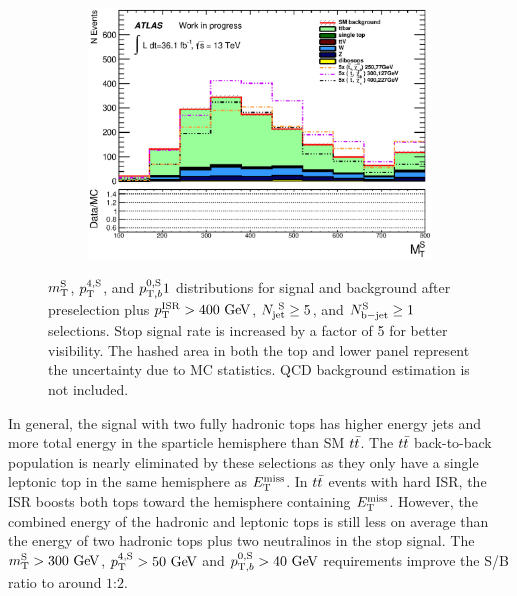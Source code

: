 \begin{figure}[h!]
\begin{center}
\begin{subfigure}[b]{0.40\textwidth}
    	 \includegraphics[width=\textwidth]{figures/plotSR/SR_ND1_MS_3SR.eps}
                \caption{ }
    \end{subfigure}
     \caption[~$\MS$, $\pTjV$, and $\pTbV$ distributions for signal and background after preselection plus $\PTISR > 400 \gev$, $\NjV \ge 5$, and $\nBJetS \ge 1$ selections]{ $\MS$, $\pTjV$, and $p_{\mathrm{T},b}^{0,\mathrm{S}}1$ distributions for signal and background after preselection plus $\PTISR > 400 \gev$, $\NjV \ge 5$, and $\nBJetS \ge 1$ selections.  Stop signal rate is increased by a factor of 5 for better visibility. The hashed area in both the top and lower panel represent the uncertainty due to MC statistics.  QCD background estimation is not included.  }
  \label{fig:SR:jetMulti2}
    \end{center}
\end{figure}

\indent In general, the signal with two fully hadronic tops has higher energy jets and more total energy in the sparticle hemisphere than SM $t\bar{t}$.  The $t\bar{t}$ back-to-back  population is nearly eliminated by these selections as they only have a single leptonic top in the same hemisphere as $E_{\mathrm{T}}^{\mathrm{miss}}$.  In $t\bar{t}$ events with hard ISR, the ISR boosts both tops toward the hemisphere containing $E_{\mathrm{T}}^{\mathrm{miss}}$.  However, the combined energy of the hadronic and leptonic tops is still less on average than the energy of two hadronic tops plus two neutralinos in the stop signal.  The $\MS > 300 \gev$, $\pTjV > 50 \gev$ and $\pTbV > 40 \gev$ requirements improve the S/B ratio to around $1$:$2$. \\


